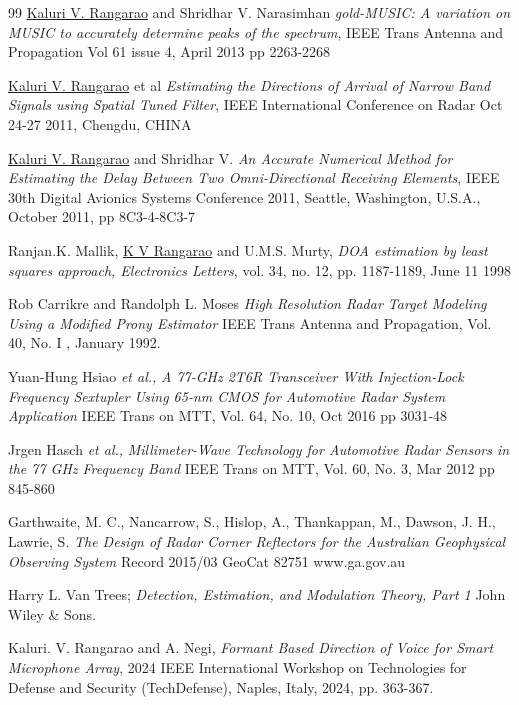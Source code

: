 \begin{thebibliography}{99}
{\href{http://ieeexplore.ieee.org/document/6376104/}
	{Kaluri V. Rangarao} and Shridhar V. Narasimhan {\em gold-MUSIC: A variation on MUSIC to accurately determine peaks of the spectrum}, IEEE Trans Antenna and Propagation Vol 61 issue 4, April 2013 pp 2263-2268}

{\href{http://ieeexplore.ieee.org/document/6159541/}
	{Kaluri V. Rangarao} et al {\em Estimating the Directions of Arrival of Narrow Band Signals using Spatial Tuned Filter}, IEEE International Conference on Radar Oct 24-27 2011, Chengdu, CHINA}

{\href{http://ieeexplore.ieee.org/document/6096146/}
	{Kaluri V. Rangarao} and Shridhar V. {\em An Accurate Numerical Method for Estimating the Delay Between Two Omni-Directional Receiving Elements}, IEEE 30th Digital Avionics Systems Conference 2011, Seattle, Washington, U.S.A., October 2011, pp 8C3-4-8C3-7}

{Ranjan.K. Mallik, 	\href{http://ieeexplore.ieee.org/document/702362/}{K V Rangarao}
and U.M.S. Murty, {\em DOA estimation by least squares approach, Electronics Letters}, 
vol. 34, no. 12, pp. 1187-1189, June 11 1998}

Rob Carrikre and Randolph L. Moses
{\it High Resolution Radar Target Modeling Using a Modified Prony Estimator}
IEEE Trans Antenna and Propagation, Vol. 40, No. I , January 1992.

Yuan-Hung Hsiao	
{\em et al.,}	
{\em A 77-GHz 2T6R Transceiver With Injection-Lock
	Frequency Sextupler Using 65-nm CMOS for
	Automotive Radar System Application}
IEEE Trans on MTT, Vol. 64, No. 10, Oct 2016 pp 3031-48	

Jrgen Hasch
{\em et al.,}
{\em Millimeter-Wave Technology for Automotive Radar Sensors in the 77 GHz Frequency Band}
IEEE Trans on MTT, Vol. 60, No. 3, Mar 2012 pp 845-860
	

Garthwaite, M. C., Nancarrow, S., Hislop, A., Thankappan, M., Dawson, J. H., Lawrie, S.
{\it The Design of Radar Corner Reflectors for the Australian Geophysical Observing System}
Record 2015/03 GeoCat 82751 www.ga.gov.au

Harry L. Van Trees;
{\it Detection, Estimation, and Modulation Theory, Part 1}
John Wiley \& Sons.

Kaluri. V. Rangarao and A. Negi, {\em Formant Based Direction of Voice for Smart Microphone Array}, 2024 IEEE International Workshop on Technologies for Defense and Security (TechDefense), Naples, Italy, 2024, pp. 363-367.	
\end{thebibliography}
